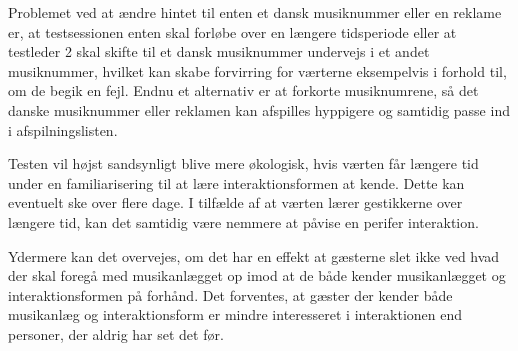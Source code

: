 Problemet ved at ændre hintet til enten et dansk musiknummer eller en reklame er, at testsessionen enten skal forløbe over en længere tidsperiode eller at testleder 2 skal skifte til et dansk musiknummer undervejs i et andet musiknummer, hvilket kan skabe forvirring for værterne eksempelvis i forhold til, om de begik en fejl. Endnu et alternativ er at forkorte musiknumrene, så det danske musiknummer eller reklamen kan afspilles hyppigere og samtidig passe ind i afspilningslisten.\blankline
%
  





 
 
Testen vil højst sandsynligt blive mere økologisk, hvis værten får længere tid under en familiarisering til at lære interaktionsformen at kende. Dette kan eventuelt ske over flere dage. I tilfælde af at værten lærer gestikkerne over længere tid, kan det samtidig være nemmere at påvise en perifer interaktion.

 Ydermere kan det overvejes, om det har en effekt at gæsterne slet ikke ved hvad der skal foregå med musikanlægget op imod at de både kender musikanlægget og interaktionsformen på forhånd. Det forventes, at gæster der kender både musikanlæg og interaktionsform er mindre interesseret i interaktionen end personer, der aldrig har set det før. \blankline
 
